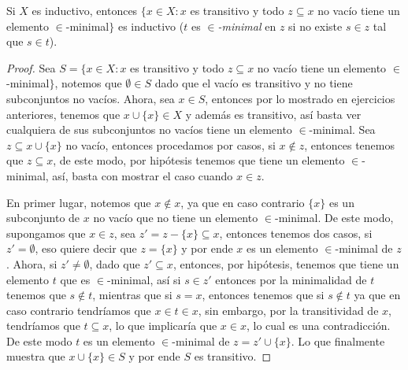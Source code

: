 \begin{exercise}[1.6]
  Si $X$ es inductivo, entonces $\{x \in X : x$ es transitivo y todo $z \subseteq x$ no vacío tiene un elemento $\in$-minimal$\}$ es inductivo ($t$ es \emph{$\in$-minimal} en $z$ si no existe $s \in z$ tal que $s \in t$).
\end{exercise}
\begin{proof}
  Sea $S = \{x \in X : x$ es transitivo y todo $z \subseteq x$ no vacío tiene un elemento $\in$-minimal$\}$, notemos que $\emptyset \in S$ dado que el vacío es transitivo y no tiene subconjuntos no vacíos. Ahora, sea $x \in S$, entonces por lo mostrado en ejercicios anteriores, tenemos que $x \cup \{x\} \in X$ y además es transitivo, así basta ver cualquiera de sus subconjuntos no vacíos tiene un elemento $\in$-minimal. Sea $z \subseteq x \cup \{x\}$ no vacío, entonces procedamos por casos, si $x \notin z$, entonces tenemos que $z \subseteq x$, de este modo, por hipótesis tenemos que tiene un elemento $\in$-minimal, así, basta con mostrar el caso cuando $x \in z$.

  En primer lugar, notemos que $x \notin x$, ya que en caso contrario $\{x\}$ es un subconjunto de $x$ no vacío que no tiene un elemento $\in$-minimal. De este modo, supongamos que $x \in z$, sea $z' = z - \{x\} \subseteq x$, entonces tenemos dos casos, si $z' = \emptyset$, eso quiere decir que $z = \{x\}$ y por ende $x$ es un elemento $\in$-minimal de $z$. Ahora, si $z' \neq \emptyset$, dado que $z' \subseteq x$, entonces, por hipótesis, tenemos que tiene un elemento $t$ que es $\in$-minimal, así si $s \in z'$ entonces por la minimalidad de $t$ tenemos que $s \notin t$, mientras que si $s = x$, entonces tenemos que si $s \notin t$ ya que en caso contrario tendríamos que $x \in t \in x$, sin embargo, por la transitividad de $x$, tendríamos que $t \subseteq x$, lo que implicaría que $x \in x$, lo cual es una contradicción. De este modo $t$ es un elemento $\in$-minimal de $z = z' \cup \{x\}$. Lo que finalmente muestra que $x \cup \{x\} \in S$ y por ende $S$ es transitivo.
\end{proof}
